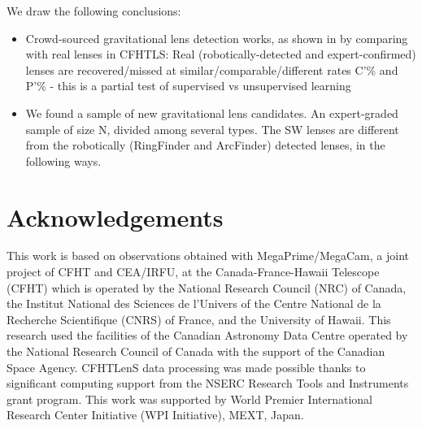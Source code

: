 \documentclass[useAMS,usenatbib,a4paper]{mn2e}
\begin{document}
We draw the following conclusions:

\begin{itemize} 

\item Crowd-sourced gravitational lens detection works, as shown in by comparing with real lenses in CFHTLS:
Real (robotically-detected and expert-confirmed) lenses are
recovered/missed at similar/comparable/different rates C’\% and P’\% - this is a partial test of supervised vs unsupervised learning


\item We found a sample of new gravitational lens candidates. An expert-graded sample of size N, divided among several types.
The SW lenses are different from the robotically (RingFinder and ArcFinder) detected lenses, in the following ways.


\end{itemize}



\section*{Acknowledgements}
 

This work is based on observations obtained with MegaPrime/MegaCam, a joint
project of CFHT and CEA/IRFU, at the Canada-France-Hawaii Telescope (CFHT) which
is operated by the National Research Council (NRC) of Canada, the Institut
National des Sciences de l'Univers of the Centre National de la Recherche
Scientifique (CNRS) of France, and the University of Hawaii. This research used
the facilities of the Canadian Astronomy Data Centre operated by the National
Research Council of Canada with the support of the Canadian Space Agency.
CFHTLenS data processing was made possible thanks to significant computing
support from the NSERC Research Tools and Instruments grant program.
This work was supported by World Premier International Research Center
Initiative (WPI Initiative), MEXT, Japan.

\end{document}
